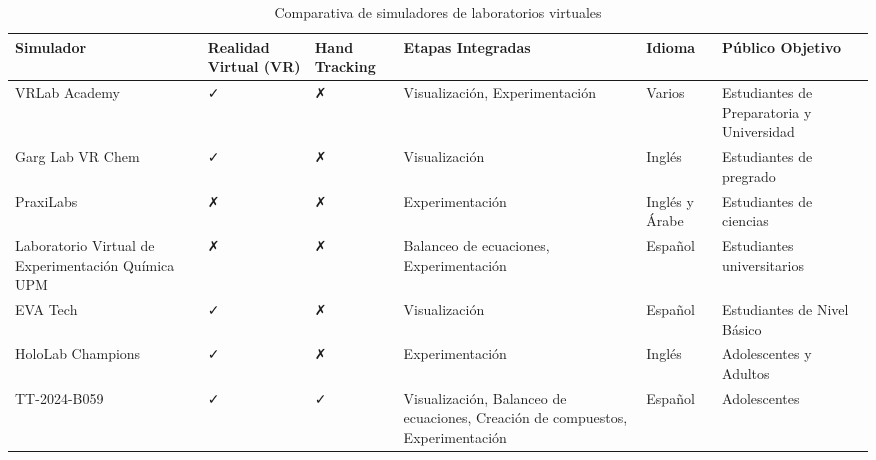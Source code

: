 \begin{table}[H]
  \centering
  \begin{tabular}{|>{\centering\arraybackslash}m{}|>{\centering\arraybackslash}m{}|>{\centering\arraybackslash}m{}|>{\centering\arraybackslash}m{}|>{\centering\arraybackslash}m{}|>{\centering\arraybackslash}m{}|}
    \hline
    \rowcolor{blue_escom}
    Simulador &  Realidad Virtual (VR) &  Hand Tracking &  Etapas Integradas & Idioma & Público Objetivo
 \\
    
    \hline
    \cellcolor{column_color}VRLab Academy & ✓ & ✗ & Visualización, Experimentación & Varios & Estudiantes de Preparatoria y Universidad \\
    
    \hline
    \cellcolor{column_color}Garg Lab VR Chem & ✓ & ✗ & Visualización & Inglés & Estudiantes de pregrado\\
    
    \hline
    \cellcolor{column_color}PraxiLabs & ✗ & ✗ & Experimentación & Inglés y Árabe & Estudiantes de ciencias\\
    
    \hline
    \cellcolor{column_color}Laboratorio Virtual de Experimentación Química UPM & ✗ & ✗ & Balanceo de ecuaciones, Experimentación & Español & Estudiantes universitarios\\
    
    \hline
   \cellcolor{column_color} EVA Tech & ✓ & ✗ & Visualización & Español & Estudiantes de Nivel Básico\\
   
    \hline
    \cellcolor{column_color}HoloLab Champions & ✓ & ✗ & Experimentación & Inglés & Adolescentes y Adultos\\
    
    \hline
    \cellcolor{column_color}TT-2024-B059 & ✓ & ✓ & Visualización, Balanceo de ecuaciones, Creación de compuestos, Experimentación & Español & Adolescentes\\
    \hline
  \end{tabular}
  \caption{Comparativa de simuladores de laboratorios virtuales}
  \label{tab:comparativa}
\end{table}
